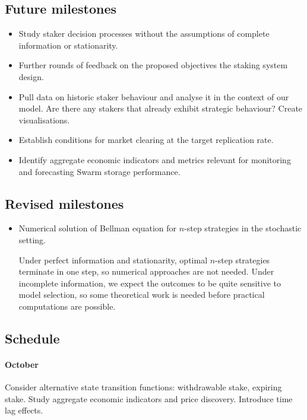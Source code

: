 \subsection*{Future milestones}
\begin{itemize}  
  \item Study staker decision processes without the assumptions of complete information or stationarity.
  \item Further rounds of feedback on the proposed objectives the staking system design.
  \item Pull data on historic staker behaviour and analyse it in the context of our model. Are there any stakers that already exhibit strategic behaviour? Create visualisations.
  \item Establish conditions for market clearing at the target replication rate.
  \item Identify aggregate economic indicators and metrics relevant for monitoring and forecasting Swarm storage performance.
\end{itemize}

\subsection*{Revised milestones}

\begin{itemize}
  \item Numerical solution of Bellman equation for $n$-step strategies in the stochastic setting. 
  
  Under perfect information and stationarity, optimal $n$-step strategies terminate in one step, so numerical approaches are not needed.
  Under incomplete information, we expect the outcomes to be quite sensitive to model selection, so some theoretical work is needed before practical computations are possible.

\end{itemize}

\subsection*{Schedule}

\paragraph{October} 
Consider alternative state transition functions: withdrawable stake, expiring stake.
%
Study aggregate economic indicators and price discovery.
%
Introduce time lag effects. 

